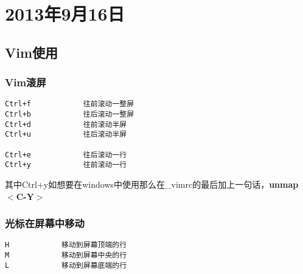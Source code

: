 \chapter{2013年9月16日}
\section{Vim使用}
\subsection{Vim滚屏}
\begin{lstlisting}
Ctrl+f            往前滚动一整屏
Ctrl+b            往后滚动一整屏
Ctrl+d            往前滚动半屏
Ctrl+u            往后滚动半屏

Ctrl+e            往后滚动一行        
Ctrl+y            往前滚动一行
\end{lstlisting}
其中Ctrl+y如想要在windows中使用那么在\_vimrc的最后加上一句话，\textbf{unmap $<$C-Y$>$}

\subsection{光标在屏幕中移动}
\begin{lstlisting}
H            移动到屏幕顶端的行
M            移动到屏幕中央的行
L            移动到屏幕底端的行
\end{lstlisting}


